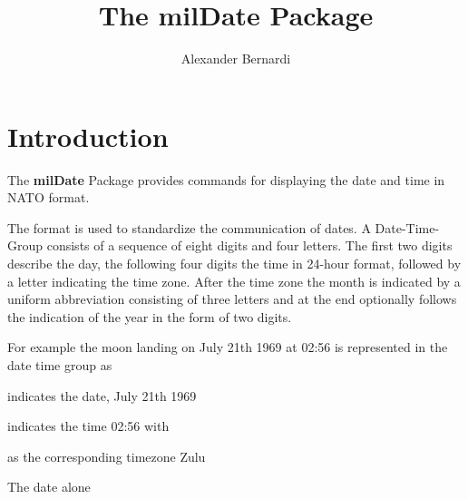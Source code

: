 \documentclass[a4paper,10pt]{scrarticle}
\title{\textnormal{The \textbf{milDate} Package}}
\author{Alexander Bernardi}
\begin{document}
\maketitle

\section{Introduction}

The \textbf{milDate} Package provides commands for displaying the date and time in NATO format.\par
The format is used to standardize the communication of dates.
A Date-Time-Group consists of a sequence of eight digits and four letters. The first two digits describe the day, the following four digits the time in 24-hour format, followed by a letter indicating the time zone. After the time zone the month is indicated by a uniform abbreviation consisting of three letters and at the end optionally follows the indication of the year in the form of two digits. \par
For example the moon landing on July 21th 1969 at 02:56 is represented in the date time group as
\par\begin{center}
\end{center}\par

 indicates the date, July 21th 1969\par\medskip

 indicates the time 02:56 with \par\medskip
{} as the corresponding timezone Zulu\par\medskip

The date alone

\par\begin{center}
\end{center}\par
\end{document}
